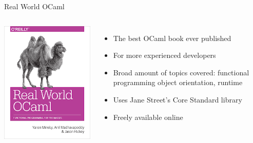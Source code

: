 \documentclass{beamer}
\begin{document}
\begin{frame}{Real World OCaml}
  \begin{columns}[c]
      \includegraphics[height=0.8\textheight]{rwo}
      \begin{itemize}
        \item The best OCaml book ever published
        \item For more experienced developers
        \item Broad amount of topics covered: functional programming
          object orientation, runtime
        \item Uses Jane Street's Core Standard library
        \item Freely available online
      \end{itemize}
  \end{columns}
\end{frame}
\end{document}
